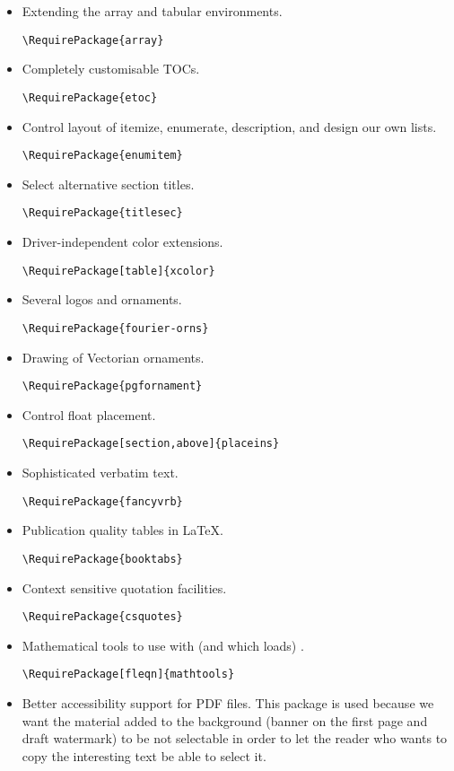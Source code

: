 \documentclass{letgut}
\begin{document}
\begin{itemize}
\item Extending the array and tabular environments.
\begin{lstlisting}
\RequirePackage{array}
\end{lstlisting}
\item Completely customisable TOCs.
\begin{lstlisting}
\RequirePackage{etoc}
\end{lstlisting}
\item Control layout of itemize, enumerate, description, and design our own lists.
\begin{lstlisting}
\RequirePackage{enumitem}
\end{lstlisting}
\item Select alternative section titles.
\begin{lstlisting}
\RequirePackage{titlesec}
\end{lstlisting}
\item Driver-independent color extensions.
\begin{lstlisting}
\RequirePackage[table]{xcolor}
\end{lstlisting}
\item Several logos and ornaments.
\begin{lstlisting}
\RequirePackage{fourier-orns}
\end{lstlisting}
\item Drawing of Vectorian ornaments.
\begin{lstlisting}
\RequirePackage{pgfornament}
\end{lstlisting}
\item Control float placement.
\begin{lstlisting}
\RequirePackage[section,above]{placeins}
\end{lstlisting}
\item Sophisticated verbatim text.
\begin{lstlisting}
\RequirePackage{fancyvrb}
\end{lstlisting}
\item Publication quality tables in \LaTeX{}.
\begin{lstlisting}
\RequirePackage{booktabs}
\end{lstlisting}
\item Context sensitive quotation facilities.
\begin{lstlisting}
\RequirePackage{csquotes}
\end{lstlisting}
\item Mathematical tools to use with (and which loads) .
\begin{lstlisting}
\RequirePackage[fleqn]{mathtools}
\end{lstlisting}
\item Better accessibility support for PDF files. This package is used because we
want the material added to the background (banner on the first page and draft
watermark) to be not selectable in order to let the reader who wants to copy
the interesting text be able to select it.
\end{itemize}
\end{document}
